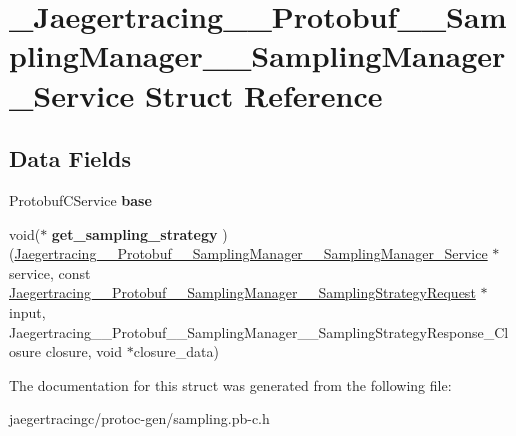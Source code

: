 \hypertarget{struct__Jaegertracing____Protobuf____SamplingManager____SamplingManager__Service}{}\section{\+\_\+\+Jaegertracing\+\_\+\+\_\+\+Protobuf\+\_\+\+\_\+\+Sampling\+Manager\+\_\+\+\_\+\+Sampling\+Manager\+\_\+\+Service Struct Reference}
\label{struct__Jaegertracing____Protobuf____SamplingManager____SamplingManager__Service}
\subsection*{Data Fields}
\begin{DoxyCompactItemize}
\item 
\mbox{\label{struct__Jaegertracing____Protobuf____SamplingManager____SamplingManager__Service_a148ac6a9a054775bb1c7a3c97eb0b80c}} 
Protobuf\+C\+Service {\bfseries base}
\item 
\mbox{\label{struct__Jaegertracing____Protobuf____SamplingManager____SamplingManager__Service_aa88c98562fdf0a68b2ccecb8f5b795b0}} 
void($\ast$ {\bfseries get\+\_\+sampling\+\_\+strategy} )(\mbox{\hyperlink{struct__Jaegertracing____Protobuf____SamplingManager____SamplingManager__Service}{Jaegertracing\+\_\+\+\_\+\+Protobuf\+\_\+\+\_\+\+Sampling\+Manager\+\_\+\+\_\+\+Sampling\+Manager\+\_\+\+Service}} $\ast$service, const \mbox{\hyperlink{struct__Jaegertracing____Protobuf____SamplingManager____SamplingStrategyRequest}{Jaegertracing\+\_\+\+\_\+\+Protobuf\+\_\+\+\_\+\+Sampling\+Manager\+\_\+\+\_\+\+Sampling\+Strategy\+Request}} $\ast$input, Jaegertracing\+\_\+\+\_\+\+Protobuf\+\_\+\+\_\+\+Sampling\+Manager\+\_\+\+\_\+\+Sampling\+Strategy\+Response\+\_\+\+Closure closure, void $\ast$closure\+\_\+data)
\end{DoxyCompactItemize}


The documentation for this struct was generated from the following file\+:\begin{DoxyCompactItemize}
\item 
jaegertracingc/protoc-\/gen/sampling.\+pb-\/c.\+h\end{DoxyCompactItemize}
